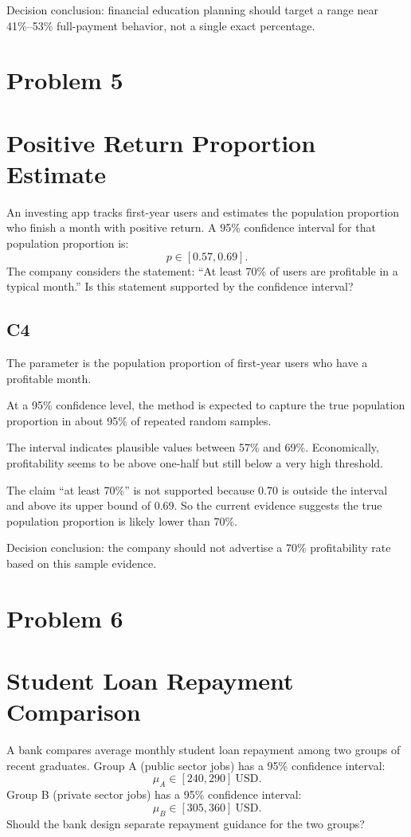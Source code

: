 \begin{ExamProblems}
		Decision conclusion: financial education planning should target a range near 41\%--53\% full-payment behavior, not a single exact percentage.

		\newpage
		\item
		\section{Problem 5}
		\section{Positive Return Proportion Estimate}
		An investing app tracks first-year users and estimates the population proportion who finish a month with positive return.
		A 95\% confidence interval for that population proportion is:
		\[
		p \in [0.57, 0.69].
		\]
		The company considers the statement: ``At least 70\% of users are profitable in a typical month.''
		Is this statement supported by the confidence interval?

		\subsection*{C4}
		The parameter is the population proportion of first-year users who have a profitable month.

		At a 95\% confidence level, the method is expected to capture the true population proportion in about 95\% of repeated random samples.

		The interval indicates plausible values between 57\% and 69\%.
		Economically, profitability seems to be above one-half but still below a very high threshold.

		The claim ``at least 70\%'' is not supported because 0.70 is outside the interval and above its upper bound of 0.69.
		So the current evidence suggests the true population proportion is likely lower than 70\%.

		Decision conclusion: the company should not advertise a 70\% profitability rate based on this sample evidence.

		\newpage
		\item
		\section{Problem 6}
		\section{Student Loan Repayment Comparison}
		A bank compares average monthly student loan repayment among two groups of recent graduates.
		Group A (public sector jobs) has a 95\% confidence interval:
		\[
		\mu_A \in [240, 290]\ \text{USD}.
		\]
		Group B (private sector jobs) has a 95\% confidence interval:
		\[
		\mu_B \in [305, 360]\ \text{USD}.
		\]
		Should the bank design separate repayment guidance for the two groups?


\end{ExamProblems}
